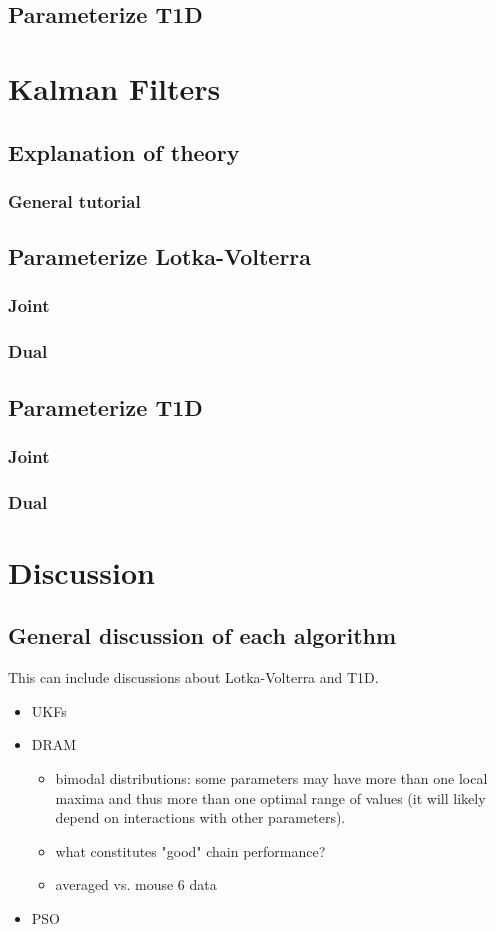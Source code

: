 \documentclass{article}
\begin{document}
\subsection{Parameterize T1D}


\section{Kalman Filters}
\subsection{Explanation of theory}
\subsubsection{General tutorial}
\subsection{Parameterize Lotka-Volterra}
\subsubsection{Joint}
\subsubsection{Dual}
\subsection{Parameterize T1D}
\subsubsection{Joint}
\subsubsection{Dual}

\section{Discussion}
\subsection{General discussion of each algorithm}
This can include discussions about Lotka-Volterra and T1D.
\begin{itemize}
    \item UKFs
    \item DRAM 
    \begin{itemize}
        \item bimodal distributions: some parameters may have more than one local maxima and thus more than one optimal range of values (it will likely depend on interactions with other parameters).
        \item what constitutes "good" chain performance?
        \item averaged vs. mouse 6 data
    \end{itemize}
    \item PSO
\end{itemize}
\end{document}
